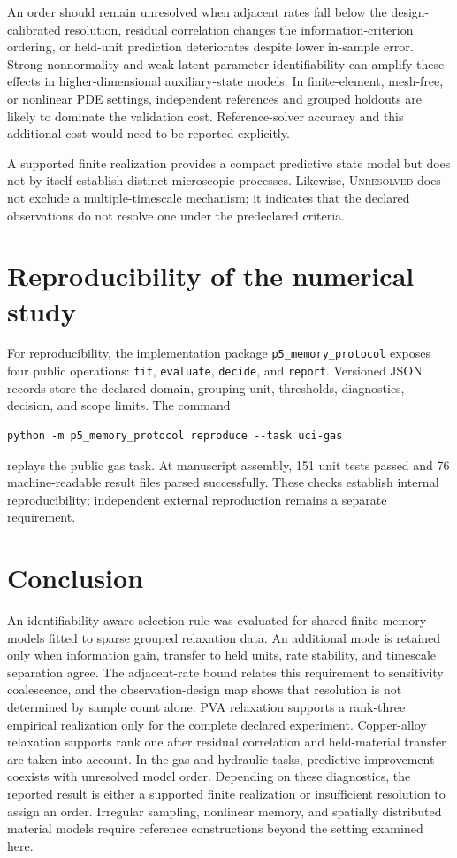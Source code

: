 \documentclass[11pt]{article}
\newcommand{\indet}{\textsc{Unresolved}}
\begin{document}
An order should remain unresolved when adjacent rates fall below the design-calibrated resolution, residual correlation changes the information-criterion ordering, or held-unit prediction deteriorates despite lower in-sample error. Strong nonnormality and weak latent-parameter identifiability can amplify these effects in higher-dimensional auxiliary-state models. In finite-element, mesh-free, or nonlinear PDE settings, independent references and grouped holdouts are likely to dominate the validation cost. Reference-solver accuracy and this additional cost would need to be reported explicitly.

A supported finite realization provides a compact predictive state model but does not by itself establish distinct microscopic processes. Likewise, \indet{} does not exclude a multiple-timescale mechanism; it indicates that the declared observations do not resolve one under the predeclared criteria.

\section{Reproducibility of the numerical study}
For reproducibility, the implementation package \texttt{p5\_memory\_protocol} exposes four public operations: \texttt{fit}, \texttt{evaluate}, \texttt{decide}, and \texttt{report}. Versioned JSON records store the declared domain, grouping unit, thresholds, diagnostics, decision, and scope limits. The command
\begin{verbatim}
python -m p5_memory_protocol reproduce --task uci-gas
\end{verbatim}
replays the public gas task. At manuscript assembly, 151 unit tests passed and 76 machine-readable result files parsed successfully. These checks establish internal reproducibility; independent external reproduction remains a separate requirement.

\section{Conclusion}
An identifiability-aware selection rule was evaluated for shared finite-memory models fitted to sparse grouped relaxation data. An additional mode is retained only when information gain, transfer to held units, rate stability, and timescale separation agree. The adjacent-rate bound relates this requirement to sensitivity coalescence, and the observation-design map shows that resolution is not determined by sample count alone. PVA relaxation supports a rank-three empirical realization only for the complete declared experiment. Copper-alloy relaxation supports rank one after residual correlation and held-material transfer are taken into account. In the gas and hydraulic tasks, predictive improvement coexists with unresolved model order. Depending on these diagnostics, the reported result is either a supported finite realization or insufficient resolution to assign an order. Irregular sampling, nonlinear memory, and spatially distributed material models require reference constructions beyond the setting examined here.
\end{document}
